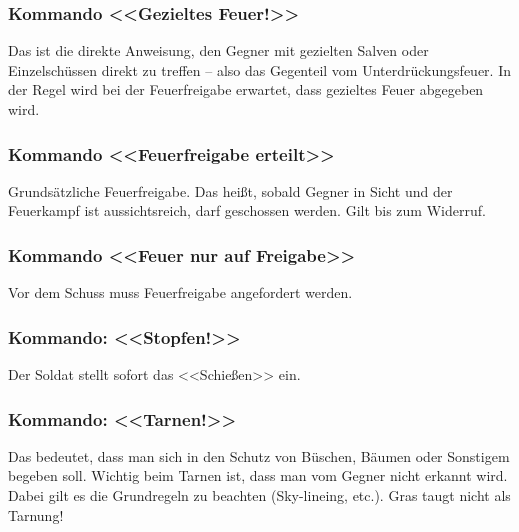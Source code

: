 \subsubsection{Kommando <<Gezieltes Feuer!>>}
	Das ist die direkte Anweisung, den Gegner mit gezielten Salven oder Einzelschüssen direkt zu treffen – also das Gegenteil vom Unterdrückungsfeuer. In der Regel wird bei der Feuerfreigabe erwartet, dass gezieltes Feuer abgegeben wird.

\subsubsection{Kommando <<Feuerfreigabe erteilt>>}
	Grundsätzliche Feuerfreigabe. Das heißt, sobald Gegner in Sicht und der Feuerkampf ist aussichtsreich, darf geschossen werden. Gilt bis zum Widerruf.

\subsubsection{Kommando <<Feuer nur auf Freigabe>>}
	Vor dem Schuss muss Feuerfreigabe angefordert werden.

\subsubsection{Kommando: <<Stopfen!>>}
	Der Soldat stellt sofort das <<Schießen>> ein.

\subsubsection{Kommando: <<Tarnen!>>}
	Das bedeutet, dass man sich in den Schutz von Büschen, Bäumen oder Sonstigem begeben soll. Wichtig beim Tarnen ist, dass man vom Gegner nicht erkannt wird. Dabei gilt es die Grundregeln zu beachten (Sky-lineing, etc.). Gras taugt nicht als Tarnung!

